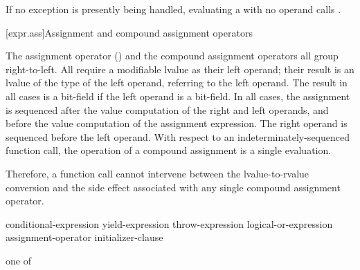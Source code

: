 \pnum
{}%
%
%
If no exception is presently being handled,
evaluating a
with no operand calls
.

[expr.ass]{Assignment and compound assignment operators}%

\pnum
{}%
%
%
%
%
%
%
%
%
%
%
%
The assignment operator (\tcode{=}) and the compound assignment
operators all group right-to-left.
%
All
require a modifiable lvalue as their left operand; their result is an lvalue
of the type of the left operand, referring to the left operand. The result in all cases is a bit-field if
the left operand is a bit-field. In all cases, the assignment is
sequenced after the
%
value computation of the right and left operands,
and before the
value computation of the assignment expression.
The right operand is sequenced before the left operand.
With
respect to an indeterminately-sequenced function call, the operation of
a compound assignment is a single evaluation.
\begin{note}
Therefore, a function call cannot intervene between the
lvalue-to-rvalue conversion and the side effect associated with any
single compound assignment operator.
\end{note}

\begin{bnf}
\br
    conditional-expression\br
    yield-expression\br
    throw-expression\br
    logical-or-expression assignment-operator initializer-clause
\end{bnf}

\begin{bnf}
 \textnormal{one of}\br
    \terminal{=  *=  /=  \%=   +=  -=  >>=  <<=  \&=  \caret=  |=}
\end{bnf}

